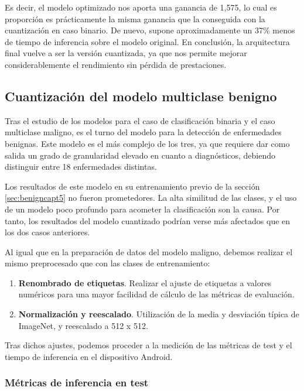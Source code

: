 Es decir, el modelo optimizado nos aporta una ganancia de 1,575, lo cual es proporción es prácticamente la misma ganancia que la conseguida con la cuantización en caso binario. De nuevo, supone aproximadamente un 37\% menos de tiempo de inferencia sobre el modelo original. 
En conclusión, la arquitectura final vuelve a ser la versión cuantizada, ya que nos permite mejorar considerablemente el rendimiento sin pérdida de prestaciones.

\subsection{Cuantización del modelo multiclase benigno}

Tras el estudio de los modelos para el caso de clasificación binaria y el caso multiclase maligno, es el turno del modelo para la detección de enfermedades benignas. Este modelo es el más complejo de los tres, ya que requiere dar como salida un grado de granularidad elevado en cuanto a diagnósticos, debiendo distinguir entre 18 enfermedades distintas.

Los resultados de este modelo en su entrenamiento previo de la sección  \ref{sec:benigncapt5} no fueron prometedores. La alta similitud de las clases, y el uso de un modelo poco profundo para acometer la clasificación son la causa. Por tanto, los resultados del modelo cuantizado podrían verse más afectados que en los dos casos anteriores.

Al igual que en la preparación de datos del modelo maligno, debemos realizar el mismo preprocesado que con las clases de entrenamiento:

\begin{enumerate}
	\item \textbf{Renombrado de etiquetas}. Realizar el ajuste de etiquetas a valores numéricos para una mayor facilidad de cálculo de las métricas de evaluación.
	\item \textbf{Normalización y reescalado}. Utilización de la media y desviación típica de ImageNet\cite{5206848}, y reescalado a 512 x 512.
\end{enumerate}

Tras dichos ajustes, podemos proceder a la medición de las métricas de test y el tiempo de inferencia en el dispositivo Android.

\subsubsection{Métricas de inferencia en test}

